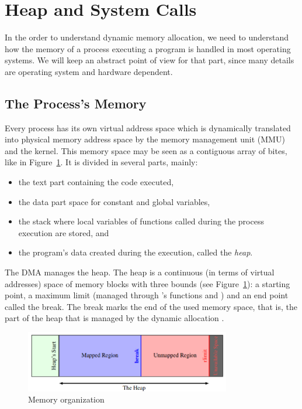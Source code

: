 
\section{Heap and System Calls}
\label{sec:heap}

In the order to understand dynamic memory allocation, we need to understand how the memory of a process executing a program is handled in most operating systems. We will keep an abstract point of view for that part, since many details are operating system and
hardware dependent.

\subsection{The Process’s Memory}
Every process has its own virtual address space which is dynamically translated into physical memory  address space by the memory management unit (MMU) and the kernel. This memory space may be seen as a contiguous array of bites, like in Figure~\ref{fig:memory}. It is divided in several parts, mainly:
\begin{itemize}
\item the text part containing the code executed,
\item the data part space for constant and global variables,
\item the stack where local variables of functions called during the process execution are stored, and 
\item the program’s data created during the execution, called the \emph{heap}.
\end{itemize}

The DMA manages the heap. The heap is a continuous (in terms of virtual addresses) space of memory blocks with three bounds (see Figure~\ref{fig:memory}): 
a starting point, 
a maximum limit (managed through ’s functions  and ) and 
an end point called the break. The break marks the end of the used memory space, that is, the part of the heap that is managed by the dynamic allocation \cite{WilsonJNB95}.

\begin{figure}[htbp]
    \begin{center}
        \includegraphics[width=0.8\textwidth]{figures/heap}
    \caption{Memory organization}
    \label{fig:memory}
    \end{center}
\end{figure}


